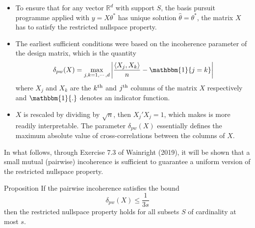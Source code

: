 \documentclass[10pt,handout,english]{beamer}
\newcommand{\R}{\mathbb{R}}
\begin{document}
\begin{frame}[allowframebreaks]
\begin{itemize}
\setlength\itemsep{0.5em}
\item{} To ensure that for any vector $\R^{d}$ with support $S$, the basis pursuit programme applied with $y=X\theta^{*}$ has unique solution $\hat{\theta}=\theta^{*}$, the matrix $X$ has to satisfy the restricted nullspace property. \justifying

\item{} The earliest sufficient conditions were based on the incoherence parameter of the design matrix, which is the quantity \justifying
\[
\delta_{pw}(X)=\max_{j,k=1,\cdots,d}\left\lvert\frac{\langle X_{j},X_{k}\rangle}{n}-\mathbbm{1}\{j=k\}\right\rvert
\]
where $X_{j}$ and $X_{k}$ are the $k\textsuperscript{th}$ and $j\textsuperscript{th}$ columns of the matrix $X$ respectively and $\mathbbm{1}\{.\}$ denotes an indicator function.  \justifying
\item{} $X$ is rescaled by dividing by $\sqrt{n}$, then $X_{j}'X_{j}=1$, which makes is more readily interpretable. The parameter $\delta_{pw}(X)$ essentially defines the maximum absolute value of cross-correlations between the columns of $X$.  \justifying
\end{itemize}
In what follows, through Exercise 7.3 of Wainright (2019), it will be shown that a small mutual (pairwise) incoherence is sufficient to guarantee a uniform version of the restricted nullspace property.

\begin{block}{Proposition}
If the pairwise incoherence satisfies the bound
\[
\delta_{pw}(X)\leq\frac{1}{3s}
\]
then the restricted nullspace property holds for all subsets $S$ of cardinality at most $s$.
\end{block}
\end{frame}
\end{document}
